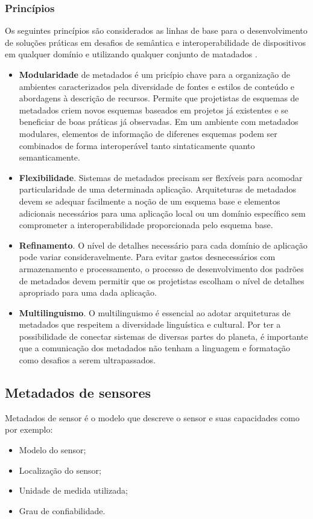 		\subsubsection{Princípios}
    Os seguintes princípios são considerados as linhas de base para o desenvolvimento de soluções práticas em desafios de semântica
    e interoperabilidade de dispositivos em qualquer domínio e utilizando qualquer conjunto de matadados \cite{metadata}.
		\begin{itemize}
		  \item \textbf{Modularidade} de metadados é um pricípio chave para a organização de ambientes caracterizados pela diversidade de fontes e estilos
      de conteúdo e abordagens à descrição de recursos. Permite que projetistas de esquemas de metadados criem novos esquemas baseados em projetos
      já existentes e se beneficiar de boas práticas já observadas. Em um ambiente com metadados modulares, elementos de informação de diferenes esquemas
      podem ser combinados de forma interoperável tanto sintaticamente quanto semanticamente.
      \item \textbf{Flexibilidade}. Sistemas de metadados precisam ser flexíveis para acomodar particularidade de uma determinada aplicação.
      Arquiteturas de metadados devem se adequar facilmente a noção de um esquema base e elementos adicionais necessários para uma aplicação local ou um
      domínio específico sem comprometer a interoperabilidade proporcionada pelo esquema base.
      \item \textbf{Refinamento}. O nível de detalhes necessário para cada domínio de aplicação pode variar consideravelmente. Para evitar gastos
      desnecessários com armazenamento e processamento, o processo de desenvolvimento dos padrões de metadados devem permitir que os projetistas
      escolham o nível de detalhes apropriado para uma dada aplicação.
      \item \textbf{Multilinguismo}. O multilinguismo é essencial ao adotar arquiteturas de metadados que respeitem a diversidade linguística e cultural.
      Por ter a possibilidade de conectar sistemas de diversas partes do planeta, é importante que a comunicação dos metadados não tenham a linguagem e formatação
      como desafios a serem ultrapassados.
		\end{itemize}
  \subsection{Metadados de sensores}
    Metadados de sensor é o modelo que descreve o sensor e suas capacidades como por exemplo:
    \begin{itemize}
      \item Modelo do sensor;
      \item Localização do sensor;
      \item Unidade de medida utilizada;
      \item Grau de confiabilidade.
    \end{itemize}

